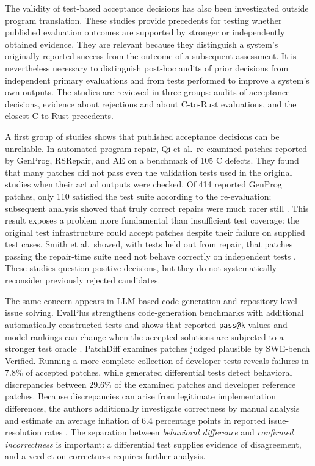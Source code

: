 The validity of test-based acceptance decisions has also been
investigated outside program translation. These studies provide
precedents for testing whether published evaluation outcomes are
supported by stronger or independently obtained evidence. They are relevant because they distinguish a system's originally reported success from the outcome of a
subsequent assessment. It is nevertheless necessary to distinguish
post-hoc audits of prior decisions from independent primary evaluations
and from tests performed to improve a system's own outputs. The studies
are reviewed in three groups: audits of acceptance decisions, evidence
about rejections and about C-to-Rust evaluations, and the closest
C-to-Rust precedents.

A first group of studies shows that published acceptance decisions can
be unreliable. In automated program repair, Qi et al.~re-examined
patches reported by
GenProg, RSRepair, and AE on a benchmark of 105 C defects. They found
that many patches did not pass even the validation tests used in the
original studies when their actual outputs were checked. Of 414 reported
GenProg patches, only 110 satisfied the test suite according to the
re-evaluation; subsequent analysis showed that truly correct repairs
were much rarer still \cite{qi2015plausibility}. This result exposes a
problem more fundamental than insufficient test coverage: the original
test infrastructure could accept patches despite their failure on
supplied test cases. Smith et al.~showed, with tests held out from
repair, that patches passing the repair-time suite need not behave
correctly on independent tests \cite{smith2015overfitting}. These studies question
positive decisions, but they do not systematically reconsider previously
rejected candidates.

The same concern appears in LLM-based code generation and
repository-level issue solving. EvalPlus strengthens code-generation
benchmarks with additional automatically constructed tests and shows
that reported \texttt{pass@k} values and model rankings can change when
the accepted solutions are subjected to a stronger test oracle
\cite{liu2023evalplus}. PatchDiff examines patches judged plausible by
SWE-bench Verified. Running a more complete collection of developer
tests reveals failures in 7.8\% of accepted patches, while generated
differential tests detect behavioral discrepancies between 29.6\% of the
examined patches and developer reference patches. Because discrepancies
can arise from legitimate implementation differences, the authors
additionally investigate correctness by manual analysis and estimate an
average inflation of 6.4 percentage points in reported issue-resolution
rates \cite{wang2026patchdiff}. The separation between \emph{behavioral
difference} and \emph{confirmed incorrectness} is important: a differential test supplies evidence of disagreement, and a verdict on correctness requires further analysis.

